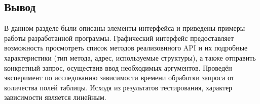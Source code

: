 \subsection*{Вывод}
В данном разделе были описаны элементы интерфейса и приведены примеры работы разработанной программы. 
Графический интерфейс предоставляет возможность просмотреть список методов реализовнного API и их подробные характеристики (тип метода, адрес, используемые структуры), а также отправить конкретный запрос, осуществив ввод необходимых аргументов.
Проведён эксперимент по исследованию зависимости времени обработки запроса от количества полей таблицы. 
Исходя из результатов тестирования, характер зависимости является линейным.




